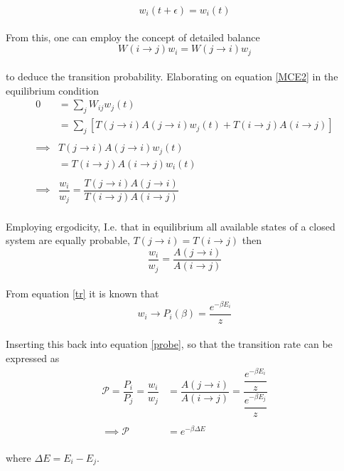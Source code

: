 \documentclass[%
reprint,nofootinbib,
amsmath,amssymb,
aps,
]{revtex4-1}
\begin{document}
\begin{equation}
	w_i(t+\epsilon) = w_i(t)
\end{equation}\\ 
From this, one can employ the concept of detailed balance 
\begin{equation}
	W(i\rightarrow j)w_i = W(j \rightarrow i)w_j
\end{equation} \\
to deduce the transition probability. Elaborating on equation \ref{MCE2} in the equilibrium condition \\ 
\begin{align}\label{probe}
	0 &=  \sum_j W_{ij}w_j(t) \nonumber \\ &= \sum_j [T(j\rightarrow i)A(j\rightarrow i)w_j(t) + T(i\rightarrow j)A(i\rightarrow j)] \nonumber\\
	& \nonumber\\
	\implies & T(j\rightarrow i)A(j\rightarrow i)w_j(t)\nonumber \\  &= T(i\rightarrow j)A(i\rightarrow j)w_i(t)\nonumber \\ 
	& \nonumber\\
	\implies& \dfrac{w_i}{w_j} = \dfrac{T(j\rightarrow i)A(j\rightarrow i)}{T(i\rightarrow j)A(i\rightarrow j)}
\end{align} \\ 
Employing ergodicity, I.e. that in equilibrium all available
states of a closed system are equally probable, $T(j\rightarrow i) = T(i \rightarrow j)$ then \\
\begin{equation}
	\dfrac{w_i}{w_j} = \dfrac{A(j\rightarrow i)}{A(i\rightarrow j)}
\end{equation} \\ 
From equation \ref{tr} it is known that \\
\begin{equation}
	w_i \rightarrow P_i(\beta) = \dfrac{e^{-\beta E_i}}{z}
\end{equation} \\ 
Inserting this back into equation \ref{probe}, 
so that the transition rate can be expressed as \\
\begin{align} \label{probrate}
	\mathcal{P} =  \dfrac{P_i}{P_j} = \dfrac{w_i}{w_j} &  = \dfrac{A(j\rightarrow i)}{A(i\rightarrow j)}  = \dfrac{\dfrac{e^{-\beta E_i}}{z}}{\dfrac{e^{-\beta E_j}}{z}} \nonumber \\ & \nonumber \\ 
     \implies \mathcal{P} & =  e^{-\beta \Delta E}
\end{align} \\ 
where $\Delta E = E_i - E_j$.
\end{document}
